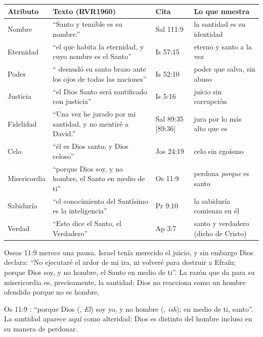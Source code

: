 \begin{center}\small\renewcommand{\arraystretch}{1.25}
\begin{tabular}{@{}L{2.2cm}L{6.6cm}L{1.8cm}L{3.6cm}@{}}
\toprule
\textbf{Atributo} & \textbf{Texto (RVR1960)} & \textbf{Cita} & \textbf{Lo que muestra} \\ \midrule
Nombre & ``Santo y temible es su nombre.'' & Sal 111:9 & la santidad es su identidad \\
Eternidad & ``el que habita la eternidad, y cuyo nombre es el Santo'' & Is 57:15 & eterno y santo a la vez \\
Poder & ``\SENOR{} desnudó su santo brazo ante los ojos de todas las naciones'' & Is 52:10 & poder que salva, sin abuso \\
Justicia & ``el Dios Santo será santificado con justicia'' & Is 5:16 & juicio sin corrupción \\
Fidelidad & ``Una vez he jurado por mi santidad, y no mentiré a David.'' & Sal 89:35 [89:36] & jura por lo más alto que es \\
Celo & ``él es Dios santo, y Dios celoso'' & Jos 24:19 & celo sin egoísmo \\
Misericordia & ``porque Dios soy, y no hombre, el Santo en medio de ti'' & Os 11:9 & perdona \emph{porque} es santo \\
Sabiduría & ``el conocimiento del Santísimo es la inteligencia'' & Pr 9:10 & la sabiduría comienza en él \\
Verdad & ``Esto dice el Santo, el Verdadero'' & Ap 3:7 & santo y verdadero (dicho de Cristo) \\
\bottomrule
\end{tabular}\end{center}

Oseas 11:9 merece una pausa. Israel tenía merecido el juicio, y sin embargo Dios declara: ``No ejecutaré el ardor de mi ira, ni volveré para destruir a Efraín; porque Dios soy, y no hombre, el Santo en medio de ti''. La razón que da para su misericordia es, precisamente, la santidad: Dios no reacciona como un hombre ofendido porque no es hombre.

\begin{filologiatexto}{Os 11:9}
: ``porque Dios (, \emph{El}) soy yo, y no hombre (, \emph{ish}); en medio de ti, santo''. La santidad aparece aquí como alteridad: Dios es distinto del hombre incluso en su manera de perdonar.
\end{filologiatexto}

